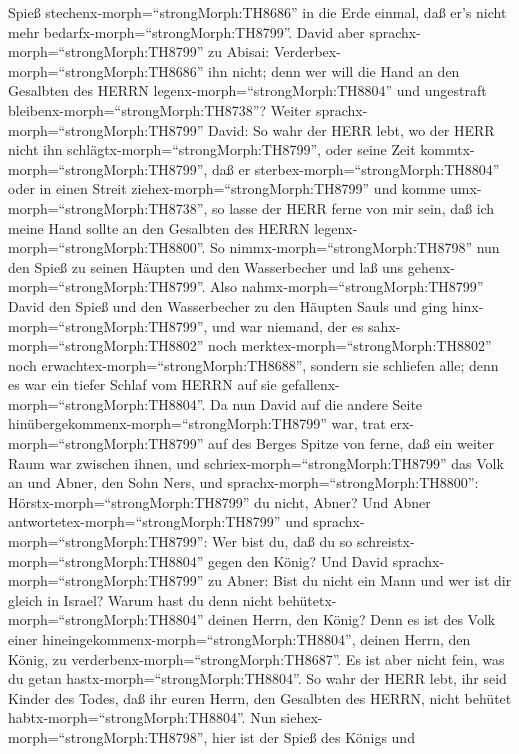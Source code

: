 Spieß stechenx-morph=``strongMorph:TH8686'' in die Erde einmal, daß er's
nicht mehr bedarfx-morph=``strongMorph:TH8799''.  David aber
sprachx-morph=``strongMorph:TH8799'' zu Abisai:
Verderbex-morph=``strongMorph:TH8686'' ihn nicht; denn wer will die Hand
an den Gesalbten des HERRN legenx-morph=``strongMorph:TH8804'' und
ungestraft bleibenx-morph=``strongMorph:TH8738''?  Weiter
sprachx-morph=``strongMorph:TH8799'' David: So wahr der HERR lebt, wo
der HERR nicht ihn schlägtx-morph=``strongMorph:TH8799'', oder seine
Zeit kommtx-morph=``strongMorph:TH8799'', daß er
sterbex-morph=``strongMorph:TH8804'' oder in einen Streit
ziehex-morph=``strongMorph:TH8799'' und komme
umx-morph=``strongMorph:TH8738'',  so lasse der HERR ferne
von mir sein, daß ich meine Hand sollte an den Gesalbten des HERRN
legenx-morph=``strongMorph:TH8800''. So
nimmx-morph=``strongMorph:TH8798'' nun den Spieß zu seinen Häupten und
den Wasserbecher und laß uns gehenx-morph=``strongMorph:TH8799''.
 Also nahmx-morph=``strongMorph:TH8799'' David den Spieß
und den Wasserbecher zu den Häupten Sauls und ging
hinx-morph=``strongMorph:TH8799'', und war niemand, der es
sahx-morph=``strongMorph:TH8802'' noch
merktex-morph=``strongMorph:TH8802'' noch
erwachtex-morph=``strongMorph:TH8688'', sondern sie schliefen alle; denn
es war ein tiefer Schlaf vom HERRN auf sie
gefallenx-morph=``strongMorph:TH8804''.  Da nun David auf
die andere Seite hinübergekommenx-morph=``strongMorph:TH8799'' war, trat
erx-morph=``strongMorph:TH8799'' auf des Berges Spitze von ferne, daß
ein weiter Raum war zwischen ihnen,  und
schriex-morph=``strongMorph:TH8799'' das Volk an und Abner, den Sohn
Ners, und sprachx-morph=``strongMorph:TH8800'':
Hörstx-morph=``strongMorph:TH8799'' du nicht, Abner? Und Abner
antwortetex-morph=``strongMorph:TH8799'' und
sprachx-morph=``strongMorph:TH8799'': Wer bist du, daß du so
schreistx-morph=``strongMorph:TH8804'' gegen den König? 
Und David sprachx-morph=``strongMorph:TH8799'' zu Abner: Bist du nicht
ein Mann und wer ist dir gleich in Israel? Warum hast du denn nicht
behütetx-morph=``strongMorph:TH8804'' deinen Herrn, den König? Denn es
ist des Volk einer hineingekommenx-morph=``strongMorph:TH8804'', deinen
Herrn, den König, zu verderbenx-morph=``strongMorph:TH8687''.
 Es ist aber nicht fein, was du getan
hastx-morph=``strongMorph:TH8804''. So wahr der HERR lebt, ihr seid
Kinder des Todes, daß ihr euren Herrn, den Gesalbten des HERRN, nicht
behütet habtx-morph=``strongMorph:TH8804''. Nun
siehex-morph=``strongMorph:TH8798'', hier ist der Spieß des Königs und
